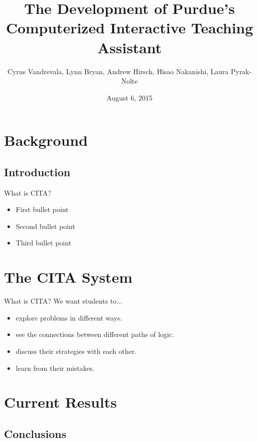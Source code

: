 \documentclass{beamer}
\title{The Development of Purdue's Computerized Interactive Teaching Assistant}
\subtitle{Cyrus Vandrevala, Lynn Bryan, Andrew Hirsch, Hisao Nakanishi, Laura Pyrak-Nolte}
\date{August 6, 2015}
\begin{document}
\begin{frame}
  \titlepage
\end{frame}

\begin{frame}
  \tableofcontents
\end{frame}

\section{Background}

\subsection{Introduction}

\begin{frame}{What is CITA?}
  \begin{itemize}
    \item<1-> First bullet point
    \item<2-> Second bullet point
    \item<3-> Third bullet point
  \end{itemize}
\end{frame}

\section{The CITA System}

\begin{frame}{What is CITA?}
  We want students to...
  \begin{itemize}
    \item explore problems in different ways.
    \item see the connections between different paths of logic.
    \item discuss their strategies with each other.
    \item learn from their mistakes.
  \end{itemize}
\end{frame}

\section{Current Results}

\subsection{Conclusions}
\end{document}

